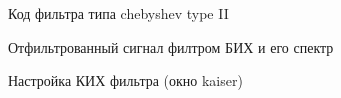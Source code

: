 \documentclass[12pt,a4paper]{scrartcl}
\begin{document}
\begin{figure}[h!]
\caption{Код фильтра типа chebyshev type II}
\end{figure}

\begin{figure}[h!]
\caption{Отфильтрованный сигнал филтром БИХ и его спектр}
\end{figure}

\begin{figure}[h!]
\caption{Настройка КИХ фильтра (окно kaiser)}
\end{figure}
\end{document}
